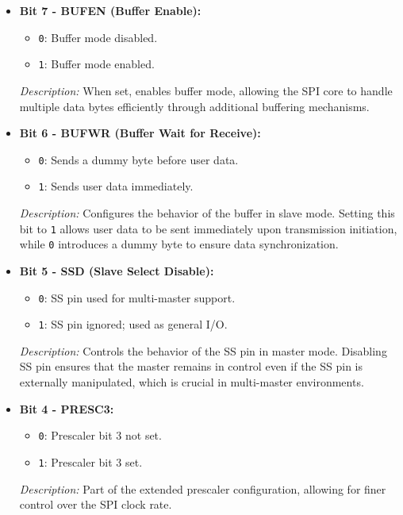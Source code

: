 \documentclass{article}
\begin{document}
\begin{itemize}
    \item \textbf{Bit 7 - BUFEN (Buffer Enable):} 
    \begin{itemize}
        \item \texttt{0}: Buffer mode disabled.
        \item \texttt{1}: Buffer mode enabled.
    \end{itemize}
    \textit{Description:} When set, enables buffer mode, allowing the SPI core to handle multiple data bytes efficiently through additional buffering mechanisms.
    
    \item \textbf{Bit 6 - BUFWR (Buffer Wait for Receive):} 
    \begin{itemize}
        \item \texttt{0}: Sends a dummy byte before user data.
        \item \texttt{1}: Sends user data immediately.
    \end{itemize}
    \textit{Description:} Configures the behavior of the buffer in slave mode. Setting this bit to \texttt{1} allows user data to be sent immediately upon transmission initiation, while \texttt{0} introduces a dummy byte to ensure data synchronization.
    
    \item \textbf{Bit 5 - SSD (Slave Select Disable):} 
    \begin{itemize}
        \item \texttt{0}: SS pin used for multi-master support.
        \item \texttt{1}: SS pin ignored; used as general I/O.
    \end{itemize}
    \textit{Description:} Controls the behavior of the SS pin in master mode. Disabling SS pin ensures that the master remains in control even if the SS pin is externally manipulated, which is crucial in multi-master environments.
    
    \item \textbf{Bit 4 - PRESC3:} 
    \begin{itemize}
        \item \texttt{0}: Prescaler bit 3 not set.
        \item \texttt{1}: Prescaler bit 3 set.
    \end{itemize}
    \textit{Description:} Part of the extended prescaler configuration, allowing for finer control over the SPI clock rate.
    

\end{itemize}
\end{document}
